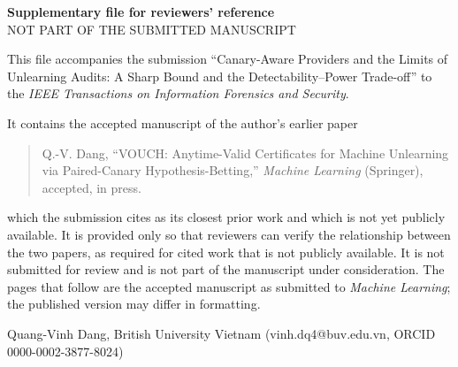 \documentclass[11pt]{article}
\begin{document}
\begin{center}
{\Large\bfseries Supplementary file for reviewers' reference}\\[1.5em]
{\large NOT PART OF THE SUBMITTED MANUSCRIPT}
\end{center}
\vspace{2em}
\noindent This file accompanies the submission ``Canary-Aware Providers and the Limits of
Unlearning Audits: A Sharp Bound and the Detectability--Power Trade-off'' to the
\emph{IEEE Transactions on Information Forensics and Security}.

\medskip
\noindent It contains the accepted manuscript of the author's earlier paper

\begin{quote}
Q.-V. Dang, ``VOUCH: Anytime-Valid Certificates for Machine Unlearning via Paired-Canary
Hypothesis-Betting,'' \emph{Machine Learning} (Springer), accepted, in press.
\end{quote}

\noindent which the submission cites as its closest prior work and which is not yet publicly
available. It is provided only so that reviewers can verify the relationship between the two
papers, as required for cited work that is not publicly available. It is not submitted for
review and is not part of the manuscript under consideration. The pages that follow are the
accepted manuscript as submitted to \emph{Machine Learning}; the published version may differ
in formatting.

\vfill
\noindent Quang-Vinh Dang, British University Vietnam (vinh.dq4@buv.edu.vn,
ORCID 0000-0002-3877-8024)
\newpage

\end{document}
